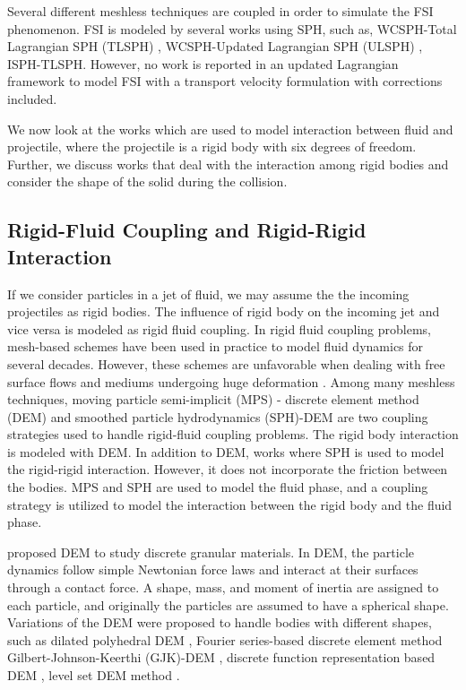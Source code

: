 Several different meshless techniques are coupled in order to simulate the FSI
phenomenon. FSI is modeled by several works using SPH, such as, WCSPH-Total
Lagrangian SPH (TLSPH) \parencite{zhan2019stabilized}, WCSPH-Updated Lagrangian SPH
(ULSPH) \parencite{antoci2007numerical}, ISPH-TLSPH\parencite{salehizadeh2022coupled}.
However, no work is reported in an updated Lagrangian framework to model FSI
with a transport velocity formulation with corrections included.


We now look at the works which are used to model interaction between fluid and
projectile, where the projectile is a rigid body with six degrees of freedom.
Further, we discuss works that deal with the interaction among rigid bodies and
consider the shape of the solid during the collision.


\subsection{Rigid-Fluid Coupling and Rigid-Rigid Interaction}
If we consider particles in a jet of fluid, we may assume the the incoming
projectiles as rigid bodies. The influence of rigid body on the incoming jet and
vice versa is modeled as rigid fluid coupling. In rigid fluid coupling problems,
mesh-based schemes \parencite{dettmer_computational_2006} have been used in practice
to model fluid dynamics for several decades. However, these schemes are
unfavorable when dealing with free surface flows and mediums undergoing huge
deformation \parencite{walkley_finite_2005}. Among many meshless techniques, moving
particle semi-implicit (MPS) - discrete element method (DEM)
\parencite{guo2017numerical} and smoothed particle hydrodynamics (SPH)-DEM
\parencite{canelas2016sph} are two coupling strategies used to handle rigid-fluid
coupling problems. The rigid body interaction is modeled with DEM. In addition
to DEM, works where SPH \parencite{amicarelli2015smoothed} is used to model the
rigid-rigid interaction. However, it does not incorporate the friction between
the bodies. MPS and SPH are used to model the fluid phase, and a coupling
strategy is utilized to model the interaction between the rigid body and the
fluid phase.

\textcite{cundall_discrete_1979} proposed DEM to study discrete granular materials.
In DEM, the particle dynamics follow simple Newtonian force laws and interact at
their surfaces through a contact force. A shape, mass, and moment of inertia are
assigned to each particle, and originally the particles are assumed to have a
spherical shape. Variations of the DEM were proposed to handle bodies with
different shapes, such as dilated polyhedral DEM \parencite{liu_new_2020}, Fourier
series-based discrete element method \parencite{lai_fourier_2020}
Gilbert-Johnson-Keerthi (GJK)-DEM \parencite{wachs2012grains3d}, discrete function
representation based DEM \parencite{lu2012critical}, level set DEM method
\parencite{duriez2021precision}.

